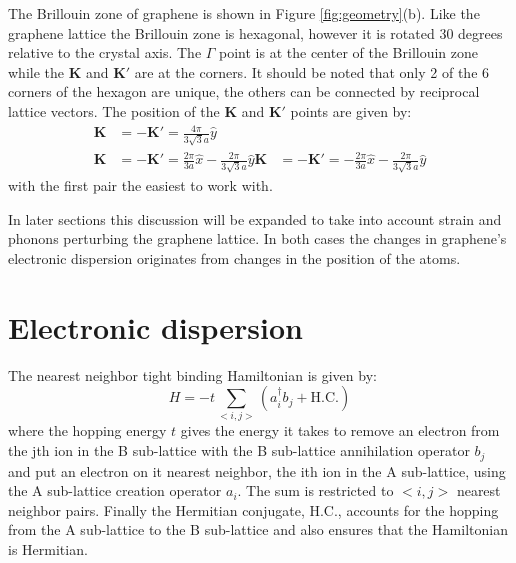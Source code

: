The Brillouin zone of graphene is shown in Figure \ref{fig:geometry}(b).  Like the graphene lattice the Brillouin zone is hexagonal, however it is rotated 30 degrees relative to the crystal axis. The $\Gamma$ point is at the center of the Brillouin zone while the $\bm{K}$ and $\bm{K'}$ are at the corners.  It should be noted that only 2 of the 6 corners of the hexagon are unique, the others can be connected by reciprocal lattice vectors.  The position of the $\bm{K}$ and $\bm{K'}$ points are given by:
\begin{align*}
	\bm{K}&=-\bm{K'}=\frac{4 \pi}{3 \sqrt{3} a} \hat{y} \\
	\bm{K}&=-\bm{K'}= \frac{2 \pi}{3 a} \hat{x}-\frac{2 \pi}{3 \sqrt{3} a} \hat{y}
	\bm{K}&=-\bm{K'}=-\frac{2 \pi}{3 a} \hat{x}-\frac{2 \pi}{3 \sqrt{3} a} \hat{y}
\end{align*}
with the first pair the easiest to work with.

In later sections this discussion will be expanded to take into account strain and phonons perturbing the graphene lattice.  In both cases the changes in graphene's electronic dispersion originates from changes in the position of the atoms.

\section{Electronic dispersion}
The nearest neighbor tight binding Hamiltonian is given by:
\begin{equation*}
	H=-t \sum_{<i,j>} (a_i^{\dagger} b_j + \text{H.C.})
\end{equation*}
where the hopping energy $t$ gives the energy it takes to remove an electron from the jth ion in the B sub-lattice with the B sub-lattice annihilation operator $b_j$ and put an electron on it nearest neighbor, the ith ion in the A sub-lattice, using the A sub-lattice creation operator $a_i$.  The sum is restricted to $<i,j>$ nearest neighbor pairs. Finally the Hermitian conjugate, $\text{H.C.}$, accounts for the hopping from the A sub-lattice to the B sub-lattice and also ensures that the Hamiltonian is Hermitian.

